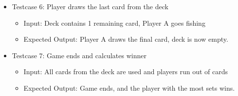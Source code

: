 \begin{itemize}
    \item Testcase 6: Player draws the last card from the deck
    \begin{itemize}
        \item Input: Deck contains 1 remaining card, Player A goes fishing
        \item Expected Output: Player A draws the final card, deck is now empty.
    \end{itemize}

    \item Testcase 7: Game ends and calculates winner
    \begin{itemize}
        \item Input: All cards from the deck are used and players run out of cards
        \item Expected Output: Game ends, and the player with the most sets wins.
    \end{itemize}
\end{itemize}
